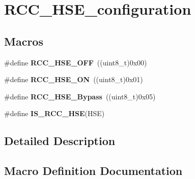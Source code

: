 \hypertarget{group___r_c_c___h_s_e__configuration}{}\section{R\+C\+C\+\_\+\+H\+S\+E\+\_\+configuration}
\label{group___r_c_c___h_s_e__configuration}
\subsection*{Macros}
\begin{DoxyCompactItemize}
\item 
\#define {\bfseries R\+C\+C\+\_\+\+H\+S\+E\+\_\+\+O\+FF}~((uint8\+\_\+t)0x00)\hypertarget{group___r_c_c___h_s_e__configuration_ga1616626d23fbce440398578855df6f97}{}\label{group___r_c_c___h_s_e__configuration_ga1616626d23fbce440398578855df6f97}

\item 
\#define {\bfseries R\+C\+C\+\_\+\+H\+S\+E\+\_\+\+ON}~((uint8\+\_\+t)0x01)\hypertarget{group___r_c_c___h_s_e__configuration_gabc4f70a44776c557af20496b04d9a9db}{}\label{group___r_c_c___h_s_e__configuration_gabc4f70a44776c557af20496b04d9a9db}

\item 
\#define {\bfseries R\+C\+C\+\_\+\+H\+S\+E\+\_\+\+Bypass}~((uint8\+\_\+t)0x05)\hypertarget{group___r_c_c___h_s_e__configuration_ga09061e9909d5f588baa7bfb0f7edd9fa}{}\label{group___r_c_c___h_s_e__configuration_ga09061e9909d5f588baa7bfb0f7edd9fa}

\item 
\#define {\bfseries I\+S\+\_\+\+R\+C\+C\+\_\+\+H\+SE}(H\+SE)
\end{DoxyCompactItemize}


\subsection{Detailed Description}


\subsection{Macro Definition Documentation}
